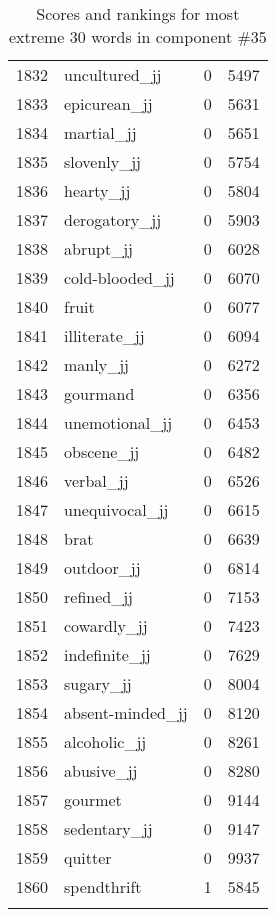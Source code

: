 \begin{longtable}[!htbp]{| rlr@{.}l |}
    1832 & uncultured\_jj & 0 & 5497 \\
    1833 & epicurean\_jj & 0 & 5631 \\
    1834 & martial\_jj & 0 & 5651 \\
    1835 & slovenly\_jj & 0 & 5754 \\
    1836 & hearty\_jj & 0 & 5804 \\
    1837 & derogatory\_jj & 0 & 5903 \\
    1838 & abrupt\_jj & 0 & 6028 \\
    1839 & cold-blooded\_jj & 0 & 6070 \\
    1840 & fruit & 0 & 6077 \\
    1841 & illiterate\_jj & 0 & 6094 \\
    1842 & manly\_jj & 0 & 6272 \\
    1843 & gourmand & 0 & 6356 \\
    1844 & unemotional\_jj & 0 & 6453 \\
    1845 & obscene\_jj & 0 & 6482 \\
    1846 & verbal\_jj & 0 & 6526 \\
    1847 & unequivocal\_jj & 0 & 6615 \\
    1848 & brat & 0 & 6639 \\
    1849 & outdoor\_jj & 0 & 6814 \\
    1850 & refined\_jj & 0 & 7153 \\
    1851 & cowardly\_jj & 0 & 7423 \\
    1852 & indefinite\_jj & 0 & 7629 \\
    1853 & sugary\_jj & 0 & 8004 \\
    1854 & absent-minded\_jj & 0 & 8120 \\
    1855 & alcoholic\_jj & 0 & 8261 \\
    1856 & abusive\_jj & 0 & 8280 \\
    1857 & gourmet & 0 & 9144 \\
    1858 & sedentary\_jj & 0 & 9147 \\
    1859 & quitter & 0 & 9937 \\
    1860 & spendthrift & 1 & 5845 \\
    \hline
    \caption{Scores and rankings for most extreme 30 words in component \#35} \\
\end{longtable}

